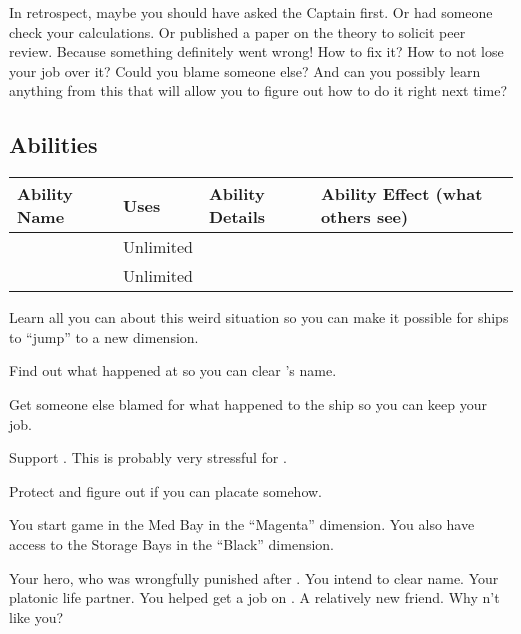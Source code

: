 \documentclass[char]{TMFHope}
\begin{document}
In retrospect, maybe you should have asked the Captain first. Or had someone check your calculations. Or published a paper on the theory to solicit peer review. Because something definitely went wrong! How to fix it? How to not lose your job over it? Could you blame someone else? And can you possibly learn anything from this that will allow you to figure out how to do it right next time?

\subsection*{Abilities}
\begin{tabular}{|p{3cm}|p{1.5cm}|p{8.5cm}|p{3cm}|} 
 \hline
 \textbf{Ability Name} & \textbf{Uses} & \textbf{Ability Details} & \textbf{Ability Effect (what others see)} \\ 
\hline 
 \aCalculate{\MYname} & Unlimited & \aCalculate{\MYtext} & \aCalculate{\MYeffect} \\ 
\hline 
\aInvestigation{\MYname} & Unlimited & \aInvestigation{\MYtext} & \aInvestigation{\MYeffect}\\ 
 \hline
\end{tabular}

\begin{itemz}[Goals]
	\item Learn all you can about this weird situation so you can make it possible for ships to ``jump'' to a new dimension.
	\item Find out what happened at \pBattle{} so you can clear \cCap{}'s name.
	\item Get someone else blamed for what happened to the ship so you can keep your job.
	\item Support \cWeap{}. This is probably very stressful for \cWeap{\them}.
	\item Protect \cBoy{} and figure out if you can placate \cEng{} somehow.
\end{itemz}

\begin{itemz}[Notes]
	\item You start game in the Med Bay in the ``Magenta'' dimension. You also have access to the Storage Bays in the ``Black'' dimension.
\end{itemz}

\begin{contacts}
	\contact{\cCap{}} Your hero, who was wrongfully punished after \pBattle{}. You intend to clear \cCap{\their} name.
	\contact{\cBoy{}} Your platonic life partner. You helped get \cBoy{\them} a job on \pNew{}.
	\contact{\cWeap{}} A relatively new friend.
	\contact{\cEng{}} Why \cEng{\does}n't \cEng{\they} like you?
\end{contacts}
\end{document}
